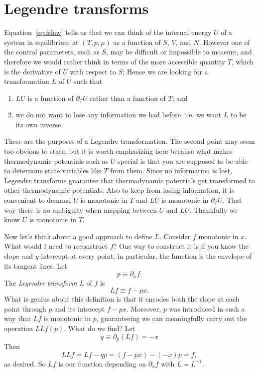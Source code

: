 \section{Legendre transforms}\label{sec:legendre}

Equation~\eqref{eq:fslaw} tells us that we can think of the internal energy
$U$ of a system in equilibrium at $(T,p,\mu)$ as a function of $S$, $V$, and
$N$. However one of the control parameters, such as $S$, may be
difficult or impossible to measure, and therefore we would rather
think in terms of the more accessible quantity $T$, which 
is the derivative of $U$ with respect to $S$; 
Hence we are looking for a transformation $L$ of $U$ such that
\begin{enumerate}
\item $LU$ is a function of $\partial_T U$ rather than a function of $T$; and 
\item we do not want to lose any information we had before, i.e. we want $L$ to
      be its own inverse.
\end{enumerate}
These are the purposes of a Legendre transformation. The second point 
may seem too obvious to state, but it is worth emphasizing here because 
what makes thermodynamic potentials such as $U$ special is that you are 
supposed to be able to determine state variables like $T$ from them. 
Since no information is lost, Legendre transforms guarantee that 
thermodynamic potentials get transformed to other thermodynamic potentials.
Also to keep from losing information, it is convenient to demand $U$ is
monotonic in $T$ and $LU$ is monotonic in $\partial_T U$. That way there
is no ambiguity when mapping between $U$ and $LU$. Thankfully we know $U$
is monotonic in $T$.

Now let's think about a good approach to define $L$. Consider $f$ monotonic in
$x$. What would I need to reconstruct $f$? One way to construct it is if you
know the slope and $y$-intercept at every point; in particular, the function is the
envelope of its tangent lines. Let
\begin{equation}
p\equiv \partial_x f.
\end{equation}
The {\it Legendre transform} $L$ of $f$ is
\begin{equation}\label{eq:legendre}
Lf\equiv f-px.
\end{equation}
What is genius about this definition is that it encodes both the slope at each point
through $p$ and its intercept $f-px$. Moreover, $p$ was introduced in such a way
that $Lf$ is monotonic in $p$, guaranteeing we can meaningfully carry out the
operation $LLf(p)$. What do we find? Let
\begin{equation}
q\equiv \partial_p (Lf) = -x
\end{equation} 
Then
\begin{equation}\label{eq:legendre}
LLf= Lf-qp = (f-px)-(-x)p = f,
\end{equation}
as desired. So $Lf$ is our function depending on $\partial_x f$ with 
$L=L^{-1}$.


